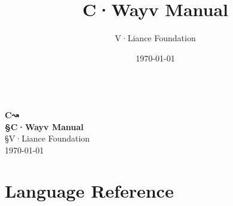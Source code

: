 \documentclass[fontsize=13pt,oneside]{cwayv}
\renewcommand{\maketitle}{
   \begin{titlepage}
     \setcounter{page}{-1}
			\begin{center}
				~\\[7cm]
				{\huge \bfseries {\T C↝ }}\\[1.5cm]
				{\huge \bfseries {\S C·Wayv Manual}}\\[8cm]
				{\S V·Liance Foundation}\\
				\today
			\end{center}
   \end{titlepage}
}
\begin{document}
\title{C·Wayv Manual}
\author{V·Liance Foundation}
\date{\today}
\maketitle


\clearpage
\todototoc
\listoftodos
\clearpage

\clearpage
\tableofcontents
\clearpage



\part{Language Reference}

%
%
%
%

%
%
%

%

%
%
%
\end{document}
